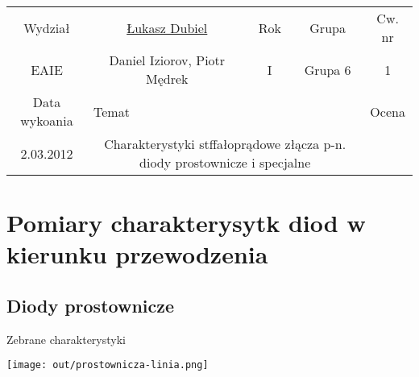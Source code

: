 \documentclass[11pt]{article}
\begin{document}
\begin{center}
\begin{tabular}{|c|c|c|c|c|}
\hline
Wydział & \underline{Łukasz Dubiel} & Rok & Grupa & Cw. nr \\
EAIE & Daniel Iziorov, Piotr Mędrek & I & Grupa 6 & 1 \\
\hline
Data wykoania & \multicolumn{3}{|l|}{Temat} & Ocena \\
2.03.2012 &  \multicolumn{3}{|p{10.5cm}|}{Charakterystyki stffałoprądowe złącza p-n. diody prostownicze i specjalne} & \\
\hline
\end{tabular}
\end{center}

\section{Pomiary charakterysytk diod w kierunku przewodzenia}
\subsection{Diody prostownicze}
Zebrane charakterystyki

\texttt{[image: out/prostownicza-linia.png]}
\end{document}
